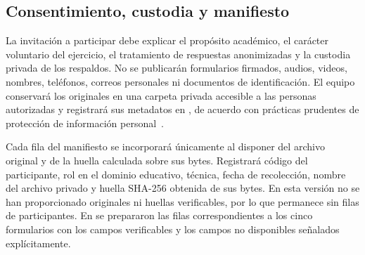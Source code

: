 \subsection{Consentimiento, custodia y manifiesto}

La invitación a participar debe explicar el propósito académico, el carácter voluntario del ejercicio, el tratamiento de respuestas anonimizadas y la custodia privada de los respaldos. No se publicarán formularios firmados, audios, videos, nombres, teléfonos, correos personales ni documentos de identificación. El equipo conservará los originales en una carpeta privada accesible a las personas autorizadas y registrará sus metadatos en , de acuerdo con prácticas prudentes de protección de información personal~\cite{lopdp2021,acm2018}.

Cada fila del manifiesto se incorporará únicamente al disponer del archivo original y de la huella calculada sobre sus bytes. Registrará código del participante, rol en el dominio educativo, técnica, fecha de recolección, nombre del archivo privado y huella SHA-256 obtenida de sus bytes. En esta versión no se han proporcionado originales ni huellas verificables, por lo que  permanece sin filas de participantes. En  se prepararon las filas correspondientes a los cinco formularios con los campos verificables y los campos no disponibles señalados explícitamente.
